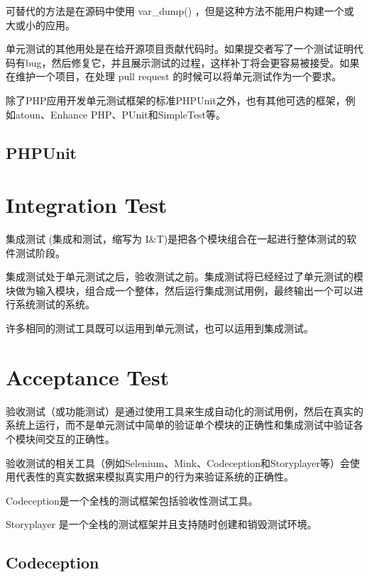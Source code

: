 可替代的方法是在源码中使用 var\_dump() ，但是这种方法不能用户构建一个或大或小的应用。

单元测试的其他用处是在给开源项目贡献代码时。如果提交者写了一个测试证明代码有bug，然后修复它，并且展示测试的过程，这样补丁将会更容易被接受。如果在维护一个项目，在处理 pull request 的时候可以将单元测试作为一个要求。

除了PHP应用开发单元测试框架的标准PHPUnit之外，也有其他可选的框架，例如atoun、Enhance PHP、PUnit和SimpleTest等。

\subsection{PHPUnit}


\section{Integration Test}

集成测试 (集成和测试，缩写为 I\&T)是把各个模块组合在一起进行整体测试的软件测试阶段。

集成测试处于单元测试之后，验收测试之前。集成测试将已经经过了单元测试的模块做为输入模块，组合成一个整体，然后运行集成测试用例，最终输出一个可以进行系统测试的系统。

许多相同的测试工具既可以运用到单元测试，也可以运用到集成测试。

\section{Acceptance Test}

验收测试（或功能测试）是通过使用工具来生成自动化的测试用例，然后在真实的系统上运行，而不是单元测试中简单的验证单个模块的正确性和集成测试中验证各个模块间交互的正确性。

验收测试的相关工具（例如Selenium、Mink、Codeception和Storyplayer等）会使用代表性的真实数据来模拟真实用户的行为来验证系统的正确性。

\begin{compactitem}
\item Codeception是一个全栈的测试框架包括验收性测试工具。
\item Storyplayer 是一个全栈的测试框架并且支持随时创建和销毁测试环境。
\end{compactitem}


\subsection{Codeception}



